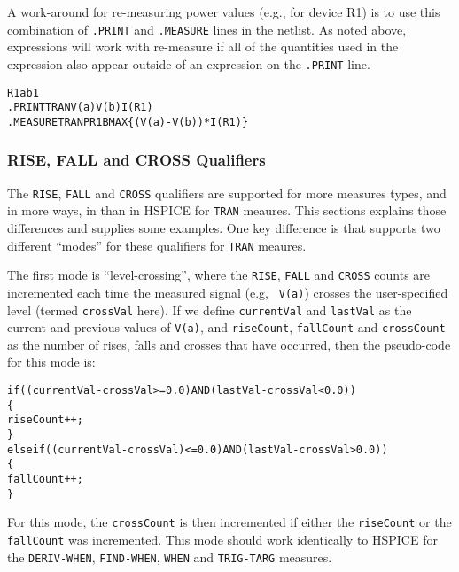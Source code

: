 A work-around for re-measuring power values (e.g., for device R1) is
to use this combination of {\tt .PRINT} and {\tt .MEASURE} lines in
the netlist.  As noted above, expressions will work with re-measure if
all of the quantities used in the expression also appear outside of an
expression on the {\tt .PRINT} line.
\begin{alltt}
R1 a b 1
.PRINT TRAN V(a) V(b) I(R1)
.MEASURE TRAN PR1B MAX \{(V(a)-V(b))*I(R1)\}
\end{alltt}

\subsubsection{RISE, FALL and CROSS Qualifiers}
The \texttt{RISE}, \texttt{FALL} and \texttt{CROSS} qualifiers are
supported for more measures types, and in more ways, in \Xyce{} than
in HSPICE for \texttt{TRAN} meaures.  This sections explains those
differences and supplies some examples.  One key difference is that
\Xyce{} supports two different ``modes'' for these qualifiers for
\texttt{TRAN} meaures.

The first mode is ``level-crossing'', where
the \texttt{RISE}, \texttt{FALL} and \texttt{CROSS} counts are
incremented each time the measured signal (e.g,
\texttt{ V(a)}) crosses the user-specified level (termed
\texttt{crossVal} here).  If we define \texttt{currentVal} and \texttt{lastVal}
as the current and previous values of \texttt{V(a)}, and \texttt{riseCount},
\texttt{fallCount} and \texttt{crossCount} as the number of rises, falls and
crosses that have occurred, then the pseudo-code for this mode is:
\begin{alltt}
if ( (currentVal-crossVal >= 0.0) AND (lastVal-crossVal < 0.0) )
\{
  riseCount++;
\}
else if( (currentVal-crossVal) <= 0.0) AND (lastVal-crossVal > 0.0) )
\{
  fallCount++;
\}
\end{alltt}

For this mode, the \texttt{crossCount} is then incremented if either
the
\texttt{riseCount}  or the \texttt{fallCount} was incremented.  This mode
should work identically to HSPICE for the \texttt{DERIV-WHEN}, \texttt{FIND-WHEN},
\texttt{WHEN} and \texttt{TRIG-TARG} measures.

